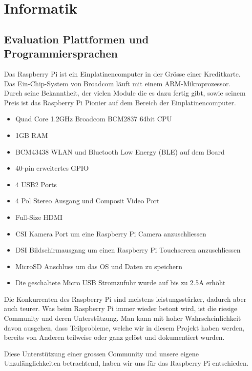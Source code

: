 \documentclass[a4paper]{report}
\begin{document}
\section{Informatik}
\label{app:sec:Inf}

\subsection{Evaluation Plattformen und Programmiersprachen}
\label{app:ssec:EvalPlattPrg}
Das Raspberry Pi ist ein Einplatinencomputer in der Grösse einer Kreditkarte. Das Ein-Chip-System von Broadcom läuft mit einem ARM-Mikroprozessor. Durch seine Bekanntheit, der vielen Module die es dazu fertig gibt, sowie seinem Preis ist das Raspberry Pi Pionier auf dem Bereich der Einplatinencomputer.

\begin{itemize}[noitemsep]
	\item Quad Core 1.2GHz Broadcom BCM2837 64bit CPU
	\item 1GB RAM
	\item BCM43438 WLAN und Bluetooth Low Energy (BLE) auf dem Board
	\item 40-pin erweitertes GPIO
	\item 4 USB2 Ports
	\item 4 Pol Stereo Ausgang und Composit Video Port
	\item Full-Size HDMI
	\item CSI Kamera Port um eine Raspberry Pi Camera anzuschliessen
	\item DSI Bildschirmausgang um einen Raspberry Pi Touchscreen anzuschliessen
	\item MicroSD Anschluss um das OS und Daten zu speichern
	\item Die geschaltete Micro USB Stromzufuhr wurde auf bis zu 2.5A erhöht
\end{itemize}\parencite{RaspberryPiFoundation2017}


Die Konkurrenten des Raspberry Pi sind meistens leistungsstärker, dadurch aber auch teurer. Was beim Raspberry Pi immer wieder betont wird, ist die riesige Community und deren Unterstützung. Man kann mit hoher Wahrscheinlichkeit davon ausgehen, dass Teilprobleme, welche wir in diesem Projekt haben werden, bereits von Anderen teilweise oder ganz gelöst und dokumentiert wurden.

Diese Unterstützung einer grossen Community und unsere eigene Unzulänglichkeiten betrachtend, haben wir uns für das Raspberry Pi entschieden.
\end{document}

